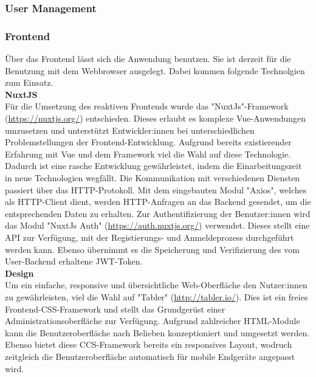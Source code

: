 \subsubsection{User Management}

\subsubsection{Frontend}

Über das Frontend lässt sich die Anwendung benutzen. Sie ist derzeit für die Benutzung mit dem Webbrowser ausgelegt. Dabei kommen folgende Technolgien zum Einsatz.  \\

\textbf{NuxtJS} \\

Für die Umsetzung des reaktiven Frontends wurde das "NuxtJs"-Framework (\href{https://nuxtjs.org/}{https://nuxtjs.org/}) entschieden. Dieses erlaubt es komplexe Vue-Anwendungen umzusetzen und unterstützt Entwickler:innen
bei unterschiedlichen Problemstellungen der Frontend-Entwicklung. Aufgrund bereits existierender Erfahrung mit Vue und dem Framework viel die Wahl auf diese Technologie.
Dadurch ist eine rasche Entwicklung gewährleistet, indem die Einarbeitungszeit in neue Technologien wegfällt. Die Kommunikation mit verschiedenen Diensten passiert
über das HTTP-Protokoll. Mit dem eingebauten Modul "Axios", welches als HTTP-Client dient, werden HTTP-Anfragen an das Backend gesendet, um die entsprechenden Daten 
zu erhalten. Zur Authentifizierung der Benutzer:innen wird das Modul "NuxtJs Auth" (\href{https://auth.nuxtjs.org/}{https://auth.nuxtjs.org/}) verwendet. Dieses stellt eine API zur Verfügung, mit der Registierungs- und Anmeldeprozess durchgeführt werden kann.
Ebenso übernimmt es die Speicherung und Verifizierung des vom User-Backend erhaltene JWT-Token. \\

\textbf{Design} \\

Um ein einfache, responsive und übersichtliche Web-Oberfläche den Nutzer:innen zu gewährleisten, viel die Wahl auf "Tabler" (\href{http://tabler.io/}{http://tabler.io/}). Dies ist ein freies Frontend-CSS-Framework
und stellt das Grundgerüst einer Administrationsoberfläche zur Verfügung. Aufgrund zahlreicher HTML-Module kann die Benutzeroberfläche nach Belieben konzeptioniert und 
umgesetzt werden. Ebenso bietet diese CCS-Framework bereits ein responsives Layout, wodruch zeitgleich die Benutzeroberfläche automatisch für mobile Endgeräte angepasst wird.

